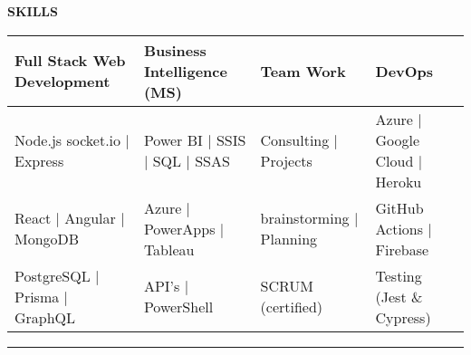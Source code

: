 \begin{center}
\textbf{SKILLS}
\end{center}

\vspace{0.3cm}

\begin{center}
\begin{tabular}{p{}p{}p{}p{}}
\textbf{Full Stack Web Development} & \textbf{Business Intelligence (MS)} & \textbf{Team Work} & \textbf{DevOps} \\
\midrule
Node.js socket.io $|$ Express & Power BI $|$ SSIS $|$ SQL $|$ SSAS & Consulting $|$ Projects & Azure $|$ Google Cloud $|$ Heroku \\
React $|$ Angular $|$ MongoDB & Azure $|$ PowerApps $|$ Tableau & brainstorming $|$ Planning & GitHub Actions $|$ Firebase \\
PostgreSQL $|$ Prisma $|$ GraphQL & API's $|$ PowerShell & SCRUM (certified) & Testing (Jest \& Cypress)
\end{tabular}
\end{center}

\vspace{0.5cm}
\rule{\textwidth}{0.5pt}
\vspace{0.5cm} 